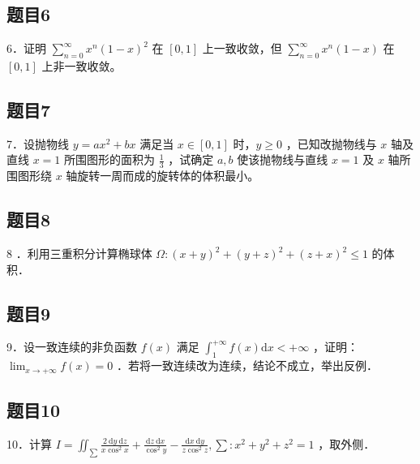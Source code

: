 \documentclass{article}
\begin{document}
\subsection{题目6}
6．证明 \(\sum_{n=0}^{\infty} x^{n}(1-x)^{2}\) 在 \([0,1]\) 上一致收敛，但 \(\sum_{n=0}^{\infty} x^{n}(1-x)\) 在 \([0,1]\) 上非一致收敛。

\subsection{题目7}
7．设抛物线 \(y=a x^{2}+b x\) 满足当 \(x \in[0,1]\) 时，\(y \geq 0\) ，已知改抛物线与 \(x\) 轴及直线 \(x=1\) 所围图形的面积为 \(\frac{1}{3}\) ，试确定 \(a, b\) 使该抛物线与直线 \(x=1\) 及 \(x\) 轴所围图形绕 \(x\) 轴旋转一周而成的旋转体的体积最小。

\subsection{题目8}
8 ．利用三重积分计算椭球体 \(\Omega:(x+y)^{2}+(y+z)^{2}+(z+x)^{2} \leq 1\) 的体积．

\subsection{题目9}
9．设一致连续的非负函数 \(f(x)\) 满足 \(\int_{1}^{+\infty} f(x) \mathrm{d} x<+\infty\) ，证明： \(\lim _{x \rightarrow+\infty} f(x)=0\) ．若将一致连续改为连续，结论不成立，举出反例．

\subsection{题目10}
10．计算 \(I=\iint_{\sum} \frac{2 \mathrm{~d} y \mathrm{~d} z}{x \cos ^{2} x}+\frac{\mathrm{d} z \mathrm{~d} x}{\cos ^{2} y}-\frac{\mathrm{d} x \mathrm{~d} y}{z \cos ^{2} z}, \sum: x^{2}+y^{2}+z^{2}=1\) ，取外侧．
\end{document}
